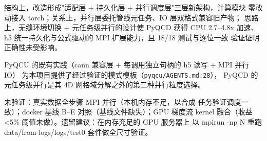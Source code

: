 \documentclass[UTF8]{ctexart}
\begin{document}
\begin{conclbox}
结构上，改造形成"适配层 + 持久化层 + 并行调度层"三层新架构，计算模块
零改动接入 torch；关系上，并行层委托管线元任务、IO 层双格式兼容旧产物；
思路上，无缝环境切换 + 元任务级并行的设计使 PyQCD 获得 CPU 2.7--4.8x
加速、h5 统一持久化与公式驱动的 MPI 扩展能力，且 18/18 测试与逐位一致
验证证明正确性未受影响。
\end{conclbox}

\begin{refbox}
PyQCU 的既有实践（cann 兼容层 + 每调用独立句柄的 h5 读写 + MPI 并行 IO）
为本项目提供了经过验证的模式模板（\texttt{\nolinkurl{pyqcu/AGENTS.md:28}}），
PyQCD 的元任务级并行是其 4D 网格域分解之外的第二种并行粒度选择。
\end{refbox}

\begin{warnbox}
\textcolor{warn}{未验证}：真实数据全步骤 MPI 并行（本机内存不足，以合成
任务验证调度一致）；docker 基线 B--E 对照（基线文件缺失）；GPU 梯度流
kernel 融合（收益 <5\% 阈值未做）。遗留建议：在内存充足的 GPU 服务器上
以 mpirun -np N 重跑 data/from-logs/logs/test0 套件做全尺寸验证。
\end{warnbox}
\end{document}

